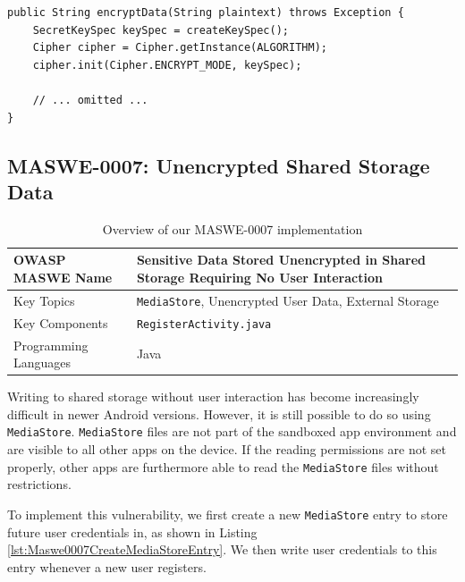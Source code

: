 \begin{lstlisting}[style=JavaStyle, float=tbh, mathescape=true, captionpos=b, caption=Using DES and a hard-coded encryption key for weak encryption, label=lst:maswe0006brokenencryption]
public String encryptData(String plaintext) throws Exception {
    SecretKeySpec keySpec = createKeySpec();
    Cipher cipher = Cipher.getInstance(ALGORITHM);
    cipher.init(Cipher.ENCRYPT_MODE, keySpec);

    // ... omitted ...
}
\end{lstlisting}

\subsection{MASWE-0007: Unencrypted Shared Storage Data}

\vspace{-1pt}

\begin{table}[H]
\centering
\renewcommand{\arraystretch}{1.3}
\begin{tabular}{p{5cm} p{8cm}} 
\toprule
OWASP MASWE Name & Sensitive Data Stored Unencrypted in Shared Storage Requiring No User Interaction \\ 
\midrule
Key Topics & \texttt{MediaStore}, Unencrypted User Data, External Storage \\
Key Components & \texttt{RegisterActivity.java} \\
Programming Languages & Java \\ 
\bottomrule
\end{tabular}
\caption{Overview of our MASWE-0007 implementation}
\label{tab:maswe-0007}
\end{table}

Writing to shared storage without user interaction has become increasingly difficult in newer Android versions. However, it is still possible to do so using \texttt{MediaStore}. \texttt{MediaStore} files are not part of the sandboxed app environment and are visible to all other apps on the device. If the reading permissions are not set properly, other apps are furthermore able to read the \texttt{MediaStore} files without restrictions. 

To implement this vulnerability, we first create a new \texttt{MediaStore} entry to store future user credentials in, as shown in Listing \ref{lst:Maswe0007CreateMediaStoreEntry}. We then write user credentials to this entry whenever a new user registers.

